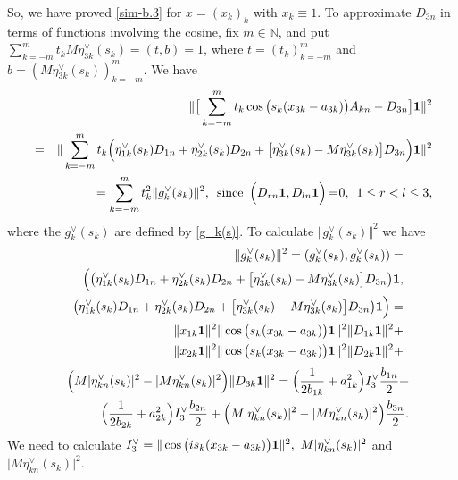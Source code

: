 \documentclass[preprint,12pt]{elsarticle}
\numberwithin{equation}{section}
\begin{document}
\begin{pf}
So, we have proved \eqref{sim-b.3}
for $x=(x_k)_k$
with $x_k\equiv 1$. 
%
To approximate $D_{3n}$ 
in terms of functions involving  the cosine,
%
fix $m\in {\mathbb N}$, 
and put $\sum_{k=-m}^mt_kM\eta^{\vee}_{3k}(s_k)=(t,b)=1$,
where $t=(t_k)_{k=-m}^m$ and $b=(M\eta^{\vee}_{3k}(s_k))_{k=-m}^m$. We have
%
\begin{eqnarray}
\nonumber
&& \Vert \big[\sum_{k=-m}^mt_k
\cos\big(s_k(x_{3k}-a_{3k})\big)A_{kn}
-D_{3n}\big]{\bf 1}
\Vert^2\\
\nonumber
&=&
\Vert 
\sum_{k=-m}^mt_k
\Big(\eta^{\vee}_{1k}(s_k)D_{1n}+\eta^{\vee}_{2k}(s_k)D_{2n}+\big[\eta^{\vee}_{3k}(s_k)-M\eta^{\vee}_{3k}(s_k)\big]D_{3n}\Big){\bf 1}
\Vert^2
\\
\label{eta^v.3.1}
&&
=\sum_{k=-m}^mt^2_k\Vert g^{\vee}_{k}(s_k)\Vert^2,\,\,\,\text{since}\,\,\,
\Big(D_{rn}{\bf 1},D_{ln}{\bf 1}\Big)\!=\!0,\,\,\,1\leq r<l\leq 3,
\end{eqnarray} 
where the $g^{\vee}_k(s_k)$ are defined by \eqref{g_k(s)}.
To calculate $\Vert g^{\vee}_{k}(s_k)\Vert^2$ we have
\begin{eqnarray}
\nonumber
&&
\Vert g^{\vee}_{k}(s_k)\Vert^2=(g^{\vee}_{k}(s_k),g^{\vee}_{k}(s_k))=\\
\nonumber
&&\Big(\big(\eta^{\vee}_{1k}(s_k)D_{1n}+\eta^{\vee}_{2k}(s_k)D_{2n}+\big[\eta^{\vee}_{3k}(s_k)-M\eta^{\vee}_{3k}(s_k)\big]D_{3n}\big){\bf 1},\\
\nonumber
&&\big(\eta^{\vee}_{1k}(s_k)D_{1n}+\eta^{\vee}_{2k}(s_k)D_{2n}+\big[\eta^{\vee}_{3k}(s_k)-M\eta^{\vee}_{3k}(s_k)\big]D_{3n}\big){\bf 1}\Big)=\\
\nonumber
&&
\Vert x_{1k}{\bf 1}\Vert^2
\Vert 
\cos\big(s_k(x_{3k}-a_{3k})\big){\bf 1}\Vert^2
\Vert D_{1k}{\bf 1}\Vert^2+\\
\nonumber
&&
\Vert x_{2k}{\bf 1}\Vert^2
\Vert \cos\big(s_k(x_{3k}-a_{3k})\big){\bf 1}\Vert^2
\Vert D_{2k}{\bf 1}\Vert^2+
\end{eqnarray}
\begin{eqnarray}
\nonumber
&&
 \Big(M\vert\eta^{\vee}_{kn}(s_k)\vert^2-\vert M\eta^{\vee}_{kn}(s_k)\vert^2\Big)
\Vert D_{3k}{\bf 1}\Vert^2=
\Big(\frac{1}{2b_{1k}}+a^2_{1k}\Big)I^{\vee}_3\frac{b_{1n}}{2}+
\\
\label{norm(g^v_k).1}
&&
\Big(\frac{1}{2b_{2k}}+a^2_{2k}\Big)I^{\vee}_3\frac{b_{2n}}{2}+
 \Big(M\vert\eta^{\vee}_{kn}(s_k)\vert^2-\vert M\eta^{\vee}_{kn}(s_k)\vert^2\Big)\frac{b_{3n}}{2}.
\end{eqnarray}
We need to calculate $I^{\vee}_3=\Vert \cos\big(is_k(x_{3k}-a_{3k})\big){\bf 1}\Vert^2,\,\,M\vert\eta^{\vee}_{kn}(s_k)\vert^2$ and $\vert M\eta^{\vee}_{kn}(s_k)\vert^2$.

\end{pf}
\end{document}
